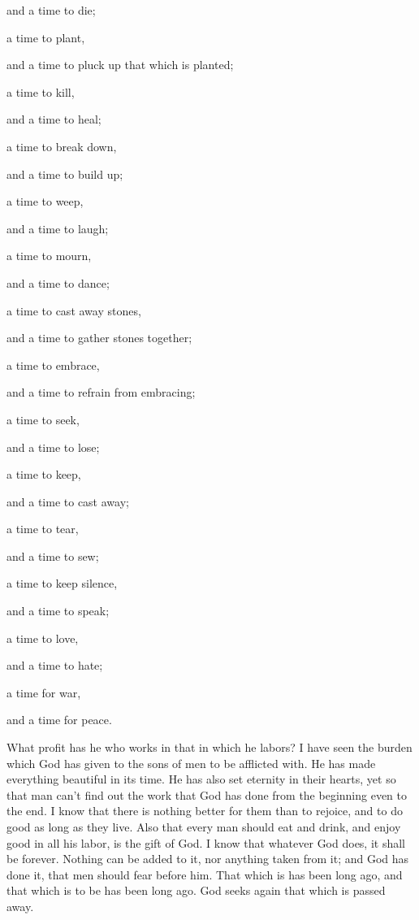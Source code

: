 and a time to die;

a time to plant,

and a time to pluck up that which is planted;

\myverse{}a time to kill,

and a time to heal;

a time to break down,

and a time to build up;

\myverse{}a time to weep,

and a time to laugh;

a time to mourn,

and a time to dance;

\myverse{}a time to cast away stones,

and a time to gather stones together;

a time to embrace,

and a time to refrain from embracing;

\myverse{}a time to seek,

and a time to lose;

a time to keep,

and a time to cast away;

\myverse{}a time to tear,

and a time to sew;

a time to keep silence,

and a time to speak;

\myverse{}a time to love,

and a time to hate;

a time for war,

and a time for peace.

\myverse{}What profit has he who works in that in which he labors?
\myverse{}I have seen the burden which God has given to the sons of men to be afflicted
with.
\myverse{}He has made everything beautiful in its time. He has also set eternity in
their hearts, yet so that man can’t find out the work that God has done from the beginning even to the
end.
\myverse{}I know that there is nothing better for them than to rejoice, and to do good
as long as they live.
\myverse{}Also that every man should eat and drink, and enjoy good in all his labor,
is the gift of God.
\myverse{}I know that whatever God does, it shall be forever. Nothing can be added to
it, nor anything taken from it; and God has done it, that men should fear before him.
\myverse{}That which is has been long ago, and that which is to be has been long ago.
God seeks again that which is passed away.

